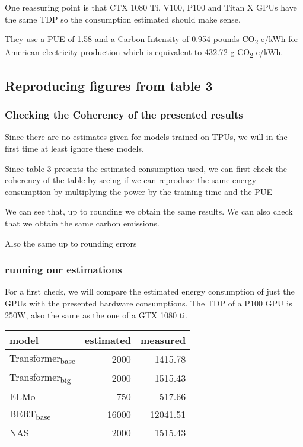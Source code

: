 \documentclass[11pt]{article}
\begin{document}
One reassuring point is that CTX 1080 Ti, V100, P100 and Titan X GPUs have the same
TDP so the consumption estimated should make sense.

They use a PUE of 1.58 and a Carbon Intensity of 0.954 pounds CO\textsubscript{2}
e/kWh for American electricity production which is equivalent to
432.72 g CO\textsubscript{2} e/kWh.

\subsection{Reproducing figures from table 3}
\label{sec:org5cd04ca}

\subsubsection{Checking the Coherency of the presented results}
\label{sec:orgf313068}

Since there are no estimates given for models trained on TPUs, we will
in the first time at least ignore these models.

Since table 3 presents the estimated consumption used, we can first
check the coherency of the table by seeing if we can reproduce the
same energy consumption by multiplying the power by the training time
and the PUE

We can see that, up to rounding we obtain the same results.
We can also check that we obtain the same carbon emissions.

Also the same up to rounding errors

\subsubsection{running our estimations}
\label{sec:orgeca84da}

For a first check, we will compare the estimated energy consumption of
just the GPUs with the presented hardware consumptions. The TDP of a
P100 GPU is 250W, also the same as the one of a GTX 1080 ti.


\begin{center}
\begin{tabular}{lrr}
model & estimated & measured\\
\hline
Transformer\textsubscript{base} & 2000 & 1415.78\\
Transformer\textsubscript{big} & 2000 & 1515.43\\
ELMo & 750 & 517.66\\
BERT\textsubscript{base} & 16000 & 12041.51\\
NAS & 2000 & 1515.43\\
\end{tabular}
\end{center}
\end{document}
